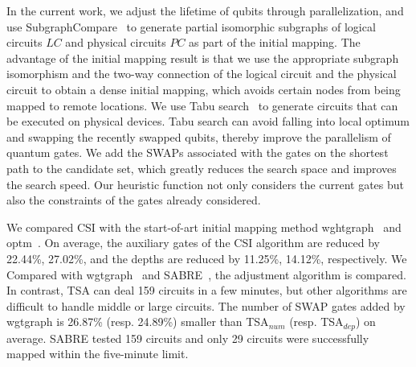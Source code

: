 \documentclass[runningheads]{llncs}
\begin{document}
In the current work, we adjust the lifetime of qubits through parallelization, and use SubgraphCompare~\cite{Sun2020} to generate partial isomorphic subgraphs of logical circuits $LC$ and physical circuits $PC$ as part of the initial mapping. The advantage of the initial mapping result is that we use the appropriate subgraph isomorphism and the two-way connection of the logical circuit and the physical circuit to obtain a dense initial mapping, which avoids certain nodes from being mapped to remote locations. We use Tabu search~\cite{Glover1990} to generate circuits that can be executed on physical devices. Tabu search can avoid falling into local optimum and swapping the recently swapped qubits, thereby improve the parallelism of quantum gates. We add the  SWAPs associated with the gates on the shortest path to the candidate set, which greatly reduces the search space and improves the search speed. Our heuristic function not only considers the current gates but also the constraints of the gates already considered.

We compared CSI with the start-of-art initial mapping method wghtgraph~\cite{2020Qubit} and optm~\cite{Zulehner2017}. On average, the auxiliary gates of the CSI algorithm are reduced by 22.44\%, 27.02\%, and the depths are reduced by 11.25\%, 14.12\%, respectively. We Compared with wgtgraph~\cite{2020Qubit} and SABRE~\cite{Li2018}, the adjustment algorithm is compared. In contrast, TSA can deal 159 circuits in a few minutes, but other algorithms are difficult to handle middle or large circuits. The number of SWAP gates added by wgtgraph is 26.87\% (resp. 24.89\%) smaller than TSA$_{num}$ (resp. TSA$_{dep}$) on average. SABRE tested 159 circuits and only 29 circuits were successfully mapped within the five-minute limit.
\end{document}
